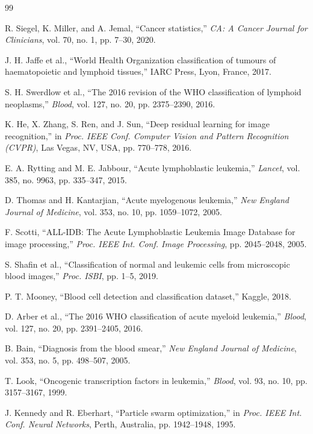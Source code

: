 \documentclass[11pt, a4paper]{article}
\begin{document}

\begin{thebibliography}{99}

R. Siegel, K. Miller, and A. Jemal, ``Cancer statistics,'' \emph{CA: A Cancer Journal for Clinicians}, vol. 70, no. 1, pp. 7--30, 2020.

J. H. Jaffe et al., ``World Health Organization classification of tumours of haematopoietic and lymphoid tissues,'' IARC Press, Lyon, France, 2017.

S. H. Swerdlow et al., ``The 2016 revision of the WHO classification of lymphoid neoplasms,'' \emph{Blood}, vol. 127, no. 20, pp. 2375--2390, 2016.

K. He, X. Zhang, S. Ren, and J. Sun, ``Deep residual learning for image recognition,'' in \emph{Proc. IEEE Conf. Computer Vision and Pattern Recognition (CVPR)}, Las Vegas, NV, USA, pp. 770--778, 2016.

E. A. Rytting and M. E. Jabbour, ``Acute lymphoblastic leukemia,'' \emph{Lancet}, vol. 385, no. 9963, pp. 335--347, 2015.

D. Thomas and H. Kantarjian, ``Acute myelogenous leukemia,'' \emph{New England Journal of Medicine}, vol. 353, no. 10, pp. 1059--1072, 2005.

F. Scotti, ``ALL-IDB: The Acute Lymphoblastic Leukemia Image Database for image processing,'' \emph{Proc. IEEE Int. Conf. Image Processing}, pp. 2045--2048, 2005.

S. Shafin et al., ``Classification of normal and leukemic cells from microscopic blood images,'' \emph{Proc. ISBI}, pp. 1--5, 2019.

P. T. Mooney, ``Blood cell detection and classification dataset,'' Kaggle, 2018.

D. Arber et al., ``The 2016 WHO classification of acute myeloid leukemia,'' \emph{Blood}, vol. 127, no. 20, pp. 2391--2405, 2016.

B. Bain, ``Diagnosis from the blood smear,'' \emph{New England Journal of Medicine}, vol. 353, no. 5, pp. 498--507, 2005.

T. Look, ``Oncogenic transcription factors in leukemia,'' \emph{Blood}, vol. 93, no. 10, pp. 3157--3167, 1999.

J. Kennedy and R. Eberhart, ``Particle swarm optimization,'' in \emph{Proc. IEEE Int. Conf. Neural Networks}, Perth, Australia, pp. 1942--1948, 1995.


\end{thebibliography}
\end{document}
